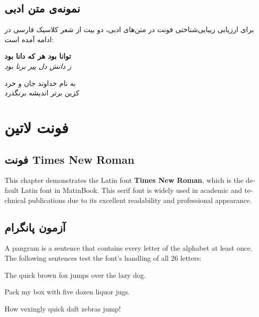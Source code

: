 \documentclass{matinbook}
\begin{document}
\section{نمونه‌ی متن ادبی}
\label{sec:font-persian-poetry}

برای ارزیابی زیبایی‌شناختی فونت در متن‌های ادبی، دو بیت از
شعر کلاسیک فارسی در ادامه آمده است:

\begin{flushright}
    \textbf{توانا بود هر که دانا بود}\\
    \textit{ز دانش دل پیر برنا بود}

    \vspace{0.5cm}
    به نام خداوند جان و خرد\\
    کزین برتر اندیشه برنگذرد
\end{flushright}

\chapter{فونت لاتین}
\label{chap:font-latin}

\section{فونت Times New Roman}
\label{sec:font-latin-times}

\begin{latin}
This chapter demonstrates the Latin font \textbf{Times New Roman},
which is the default Latin font in MatinBook. This serif font is
widely used in academic and technical publications due to its
excellent readability and professional appearance.
\end{latin}

\section{آزمون پانگرام}
\label{sec:font-latin-pangram}

\begin{latin}
A pangram is a sentence that contains every letter of the alphabet
at least once. The following sentences test the font's handling of
all 26 letters:

The quick brown fox jumps over the lazy dog.

Pack my box with five dozen liquor jugs.

How vexingly quick daft zebras jump!
\end{latin}
\end{document}
